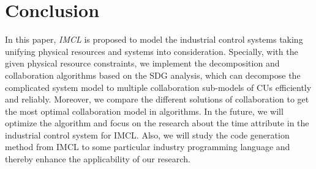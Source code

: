 \section{Conclusion}
In this paper, \emph{IMCL} is proposed to model the industrial control systems taking unifying physical resources and systems into consideration.
Specially, with the given physical resource constraints, we implement the decomposition and collaboration algorithms based on the SDG analysis, which can decompose the complicated system model to multiple collaboration sub-models of CUs efficiently and reliably.
Moreover, we compare the different solutions of collaboration to get the most optimal collaboration model in algorithms.
In the future,  we will optimize the algorithm and focus on the research about the time attribute in the industrial control system for IMCL. Also, we will study the code generation method from IMCL to some particular industry programming language and thereby enhance the applicability of our research.


